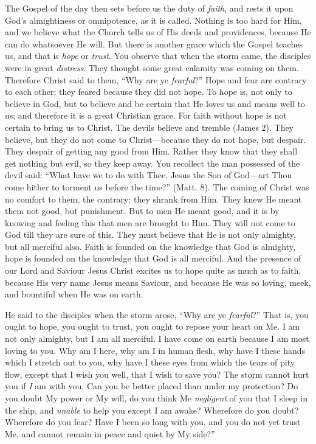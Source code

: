 The Gospel of the day then sets before us the
duty of \emph{faith}, and rests it upon God's almightiness or
omnipotence, as it is called. Nothing is too hard for Him, and we
believe what the Church tells us of His deeds and providences, because
He can do whatsoever He will. But there is another grace which the
Gospel teaches us, and that is \emph{hope} or \emph{trust}. You
observe that when the storm came, the disciples were in great \emph{distress}.
They thought some great calamity was coming on them. Therefore Christ
said to them, ``Why are ye \emph{fearful}?'' Hope and fear are contrary
to each other; they feared because they did not hope. To hope is, not
only to believe in God, but to believe and be certain that He loves us
and means well to us; and therefore it is a great Christian grace. For
faith without hope is not certain to bring us to Christ. The devils
believe and tremble (James 2). They believe, but they do not come to
Christ—because they do not hope, but despair. They despair of
getting any good from Him. Rather they know that they shall get
nothing but evil, so they keep away. You recollect the man possessed
of the devil said: ``What have we to do with Thee, Jesus the Son of
God—art Thou come hither to torment us before the time?'' (Matt. 8).
The coming of Christ was no comfort to them, the contrary: they shrank
from Him. They knew He meant them not good, but punishment. But to men
He meant good, and it is by knowing and feeling this that men are
brought to Him. They will not come to God till they are sure of this.
They must believe that He is not only almighty, but all merciful also.
Faith is founded on the knowledge that God is almighty, hope is
founded on the knowledge that God is all merciful. And the presence of
our Lord and Saviour Jesus Christ excites us to hope quite as much as
to faith, because His very name Jesus means Saviour, and because He
was so loving, meek, and bountiful when He was on earth.

He said to the disciples when the storm arose,
``Why are ye \emph{fearful}?'' That is, you ought to hope, you
ought to trust, you ought to repose your heart on Me. I am not only
almighty, but I am all merciful. I have come on earth because I am
most loving to you. Why am I here, why am I in human flesh, why have I
these hands which I stretch out to you, why have I these eyes from
which the tears of pity flow, except that I wish you well, that I wish
to save you? The storm cannot hurt you if \emph{I} am with you. Can
you be better placed than under my protection? Do you doubt My power
or My will, do you think Me \emph{negligent} of you that I sleep in
the ship, and \emph{unable} to help you except I am awake? Wherefore
do you doubt? Wherefore do you fear? Have I been so long with you, and
you do not yet trust Me, and cannot remain in peace and quiet by My
side?''

